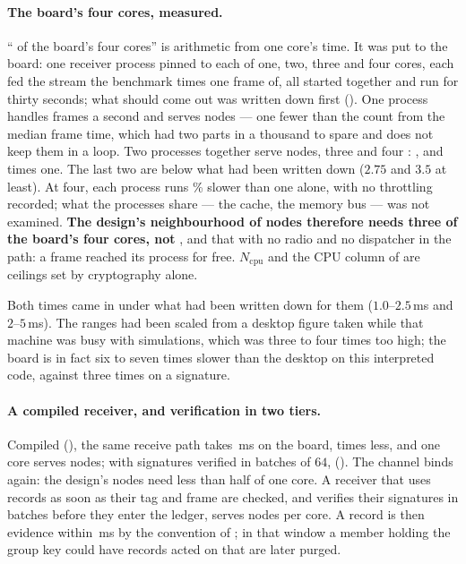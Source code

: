 \begin{remark}
\paragraph{The board's four cores, measured.} ``\cpuProtoCores{} of the board's four cores'' is
arithmetic from one core's time. It was put to the board: one receiver process pinned to each
of one, two, three and four cores, each fed the stream the benchmark times one frame of, all
started together and run for thirty seconds; what should come out was written down first
(). One process handles \mcOneFps{} frames a second and serves \mcNodesOne{}
nodes --- one fewer than the count from the median frame time, which had two parts in a thousand
to spare and does not keep them in a loop. Two processes together serve \mcNodesTwo{} nodes,
three \mcNodesThree{} and four \mcNodesFour: \mcScaleTwo, \mcScaleThree{} and \mcScaleFour{}
times one. The last two are below what had been written down ($2.75$ and $3.5$ at least). At
four, each process runs \mcSlowFourPct\% slower than one alone, with no throttling recorded;
what the processes share --- the cache, the memory bus --- was not examined. \textbf{The
design's neighbourhood of \nmaxLeanDesign{} nodes therefore needs three of the board's four
cores, not \cpuProtoCores}, and that with no radio and no dispatcher in the path: a frame
reached its process for free. $N_{\mathrm{cpu}}$ and the CPU column of
 are ceilings set by cryptography alone.

Both times came in under what had been written down for them ($1.0$--$2.5$\,ms and
$2$--$5$\,ms). The ranges had been scaled from a desktop figure taken while that machine was
busy with simulations, which was three to four times too high; the board is in fact six to
seven times slower than the desktop on this interpreted code, against three times on a
signature.
\end{remark}

\paragraph{A compiled receiver, and verification in two tiers.} Compiled
(), the same receive path takes \rxRustMs\,ms on the board, \rxSpeedup{}
times less, and one core serves \rxRustNodes{} nodes; with signatures verified in batches of
$64$, \rxBatchNodes{} (). The channel binds again: the design's
\nmaxLeanDesign{} nodes need less than half of one core. A receiver that uses records as soon as
their tag and frame are checked, and verifies their signatures in batches before they enter the
ledger, serves \rxLazyNodes{} nodes per core. A record is then evidence within
\rxEvidenceMs\,ms by the convention of ; in that window a member
holding the group key could have records acted on that are later purged.

